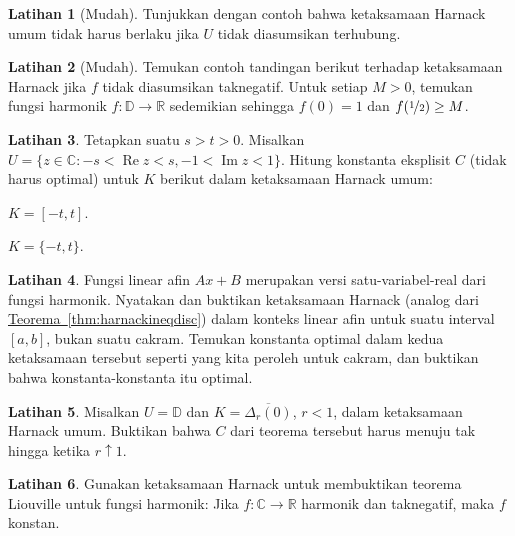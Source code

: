 \documentclass[12pt,openany]{book}
\renewcommand{\Re}{\operatorname{Re}}
\renewcommand{\Im}{\operatorname{Im}}
\newcommand{\C}{{\mathbb{C}}}
\newcommand{\R}{{\mathbb{R}}}
\newcommand{\D}{{\mathbb{D}}}
\theoremstyle{plain}
\theoremstyle{remark}
\theoremstyle{definition}
\newenvironment{exbox}{%
    \def\FrameCommand{\vrule width 1pt \relax\hspace{10pt}}%
    \MakeFramed{\advance\hsize-\width\FrameRestore}%
}{%
    \endMakeFramed
}
\newenvironment{expartshor}[1]{%
    \begingroup%
    \NumTabs{#1}%
    \leavevmode%
    \par%
    \begin{enumerate*}[a),itemjoin={\tab}]
}{%
    \end{enumerate*}\endgroup\par
}
\theoremstyle{exercise}
\newtheorem{exercise}{Latihan}[section]
\theoremstyle{example}
\newcommand{\thmref}[1]{\hyperref[#1]{Teorema~\ref*{#1}}}
\begin{document}
\begin{exbox}
\begin{exercise}[Mudah]
Tunjukkan dengan contoh bahwa ketaksamaan Harnack umum tidak harus berlaku jika $U$
tidak diasumsikan terhubung.
\end{exercise}

\begin{exercise}[Mudah]
Temukan contoh tandingan berikut terhadap ketaksamaan Harnack
jika $f$ tidak diasumsikan
taknegatif.  Untuk setiap $M > 0$, temukan
fungsi harmonik $f \colon \D \to \R$ sedemikian sehingga $f(0) = 1$ dan
$f(\nicefrac{1}{2}) \geq M$.
\end{exercise}

\begin{exercise}
Tetapkan suatu $s > t > 0$.
Misalkan $U = \{z \in \C : -s < \Re z < s, -1 < \Im z < 1 \}$.
Hitung konstanta eksplisit $C$
(tidak harus optimal)
untuk $K$ berikut dalam
ketaksamaan Harnack umum:
\smallskip
\begin{expartshor}{2}
\item
$K = [-t,t]$.
\item
$K = \{-t,t\}$.
\end{expartshor}
\end{exercise}

\begin{exercise}
Fungsi linear afin $Ax+B$ merupakan versi satu-variabel-real
dari fungsi harmonik.  Nyatakan dan buktikan ketaksamaan Harnack
(analog dari \thmref{thm:harnackineqdisc})
dalam konteks linear afin untuk suatu interval $[a,b]$, bukan suatu cakram.
Temukan konstanta optimal dalam kedua ketaksamaan tersebut seperti yang kita peroleh untuk cakram,
dan buktikan bahwa konstanta-konstanta itu optimal.
\end{exercise}

\begin{exercise}
Misalkan $U = \D$ dan $K=\overline{\Delta_r(0)}$, $r < 1$, dalam 
ketaksamaan Harnack umum.  Buktikan bahwa $C$ dari teorema tersebut
harus menuju tak hingga ketika $r \uparrow 1$.
\end{exercise}

\begin{exercise}
Gunakan ketaksamaan Harnack untuk membuktikan teorema Liouville
untuk fungsi harmonik:
Jika $f \colon \C \to \R$ harmonik
dan taknegatif, maka $f$ konstan.
\end{exercise}
\end{exbox}
\end{document}
